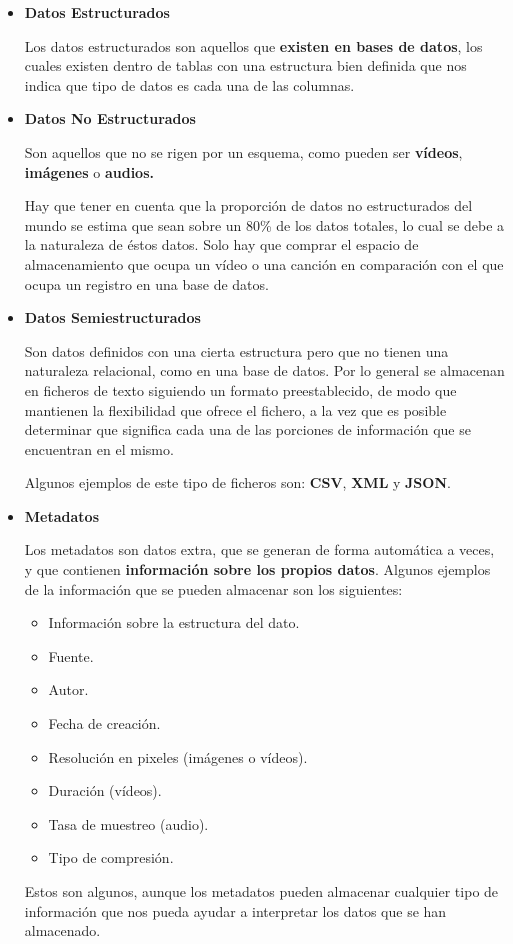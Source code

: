 \begin{itemize}
	\item \textbf{Datos Estructurados}
	
	Los datos estructurados son aquellos que \textbf{existen en bases de datos}, los cuales existen dentro de tablas con una estructura bien definida que nos indica que tipo de datos es cada una de las columnas.
	
	\item \textbf{Datos No Estructurados}
	
	Son aquellos que no  se rigen por un esquema, como pueden ser \textbf{vídeos}, \textbf{imágenes} o \textbf{audios.}
	
	Hay que tener en cuenta que la proporción de datos no estructurados del mundo se estima que sean sobre un 80\% de los datos totales, lo cual se debe a la naturaleza de éstos datos. Solo hay que comprar el espacio de almacenamiento que ocupa un vídeo o una canción en comparación con el que ocupa un registro en una base de datos.
	
	\item \textbf{Datos Semiestructurados}
	
	Son datos definidos con una cierta estructura pero que no tienen una naturaleza relacional, como en una base de datos. Por lo general se almacenan en ficheros de texto siguiendo un formato preestablecido, de modo que mantienen la flexibilidad que ofrece el fichero, a la vez que es posible determinar que significa cada una de las porciones de información que se encuentran en el mismo.
	
	Algunos ejemplos de este tipo de ficheros son: \textbf{CSV}, \textbf{XML} y \textbf{JSON}.
	
	\item \textbf{Metadatos}
	
	Los metadatos son datos extra, que se generan de forma automática a veces, y que contienen \textbf{información sobre los propios datos}. Algunos ejemplos de la información que se pueden almacenar son los siguientes:
	
	\begin{itemize}
		\item Información sobre la estructura del dato.
		\item Fuente.
		\item Autor.
		\item Fecha de creación.
		\item Resolución en pixeles (imágenes o vídeos).
		\item Duración (vídeos).
		\item Tasa de muestreo (audio).
		\item Tipo de compresión.
	\end{itemize}
	
	Estos son algunos, aunque los metadatos pueden almacenar cualquier tipo de información que nos pueda ayudar a interpretar los datos que se han almacenado.
\end{itemize}

